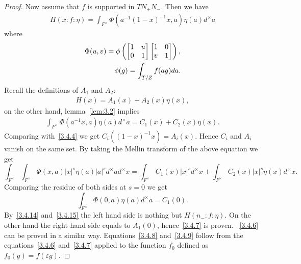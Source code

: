 \begin{proof}
Now assume that $f$ is supported in $TN_+ N_-$.
Then we have
\begin{align}
    H(x:f:\eta) = \int_{F^\times} \Phi(a^{-1}(1-x)^{-1}x, a) \eta(a) d^\times a
\end{align}
where
\begin{align}
    \Phi(u, v) = \phi\left(\begin{bmatrix} 1 & u \\ 0 & 1 \end{bmatrix} \begin{bmatrix} 1 & 0 \\ v & 1 \end{bmatrix} \right), \label{3.4.14} \\
    \phi(g) = \int_{T/Z} f(ag) da. \label{3.4.15}
\end{align}
Recall the definitions of $A_1$ and $A_2$:
\begin{align}
    H(x) = A_1(x) + A_2(x)\eta(x),
\end{align}
on the other hand, lemma~\eqref{lem:3.2} implies
\begin{align}
    \int_{F^\times} \Phi(a^{-1} x, a) \eta(a) d^\times a = C_1(x) + C_2(x) \eta(x).
\end{align}
Comparing with~\eqref{3.4.4} we get $C_i((1-x)^{-1}x) = A_i(x)$.
Hence $C_i$ and $A_i$ vanish on the same set.
By taking the Mellin transform of the above equation we get
\[
\int_{F^\times} \int_{F^\times} \Phi(x, a) |x|^{s} \eta(a) |a|^{s} d^\times a d^\times x = \int_{F^\times} C_1(x) |x|^{s} d^\times x + \int_{F^\times} C_2(x) |x|^{s} \eta(x) d^\times x.
\]
Comparing the residue of both sides at $s = 0$ we get
\[
\int_{F^\times} \Phi(0, a) \eta(a) d^\times a = C_1(0).
\]
By~\eqref{3.4.14} and~\eqref{3.4.15} the left hand side is nothing but $H(n_-:f:\eta)$.
On the other hand the right hand side equals to $A_1(0)$, hence~\eqref{3.4.7} is proven.
~\eqref{3.4.6} can be proved in a similar way.
Equations~\eqref{3.4.8} and~\eqref{3.4.9} follow from the equations~\eqref{3.4.6} and~\eqref{3.4.7} applied to the function $f_0$ defined as $f_0(g) = f(\varepsilon g)$.
\end{proof}